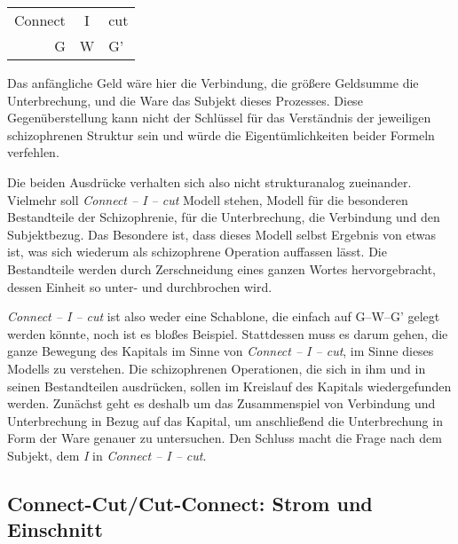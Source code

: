 \documentclass[12pt,
               paper=a4,
               twoside=false,
               onehalfspacing,
               bibliography=totoc,
               toc=graduated,
               ]{scrartcl}
\newcommand{\worries}[1]{\ifdraft{\textcolor{blue}{\texttt{(#1)}}}{}}
\newcommand{\gwg}{G--W--G'\xspace}
\newcommand{\cic}{Connect -- I -- cut\xspace}
\begin{document}
{\centering\hfill
\begin{tabular}{r@{ -- }c@{ -- }l}
Connect & I & cut\\
G & W & G'
\end{tabular}
\hfill}

Das anfängliche Geld wäre hier die Verbindung, die größere Geldsumme
die Unterbrechung, und die Ware das Subjekt dieses Prozesses. Diese
Gegenüberstellung kann nicht der Schlüssel für das Verständnis der
jeweiligen schizophrenen Struktur sein und würde die
Eigentümlichkeiten beider Formeln verfehlen.

Die beiden Ausdrücke verhalten sich also nicht strukturanalog
zueinander. Vielmehr soll \emph{\cic} Modell stehen, Modell für die
besonderen Bestandteile der Schizophrenie, für die Unterbrechung, die
Verbindung und den Subjektbezug. Das Besondere ist, dass dieses Modell
selbst Ergebnis von etwas ist, was sich wiederum als schizophrene
Operation auffassen lässt. Die Bestandteile werden durch Zerschneidung
eines ganzen Wortes hervorgebracht, dessen Einheit so unter- und
durchbrochen wird.

\emph{\cic} ist also weder eine Schablone, die einfach auf \gwg gelegt
werden könnte, noch ist es bloßes Beispiel. Stattdessen muss es darum
gehen, die ganze Bewegung des Kapitals im Sinne von \emph{\cic}, im
Sinne dieses Modells zu verstehen. Die schizophrenen Operationen, die
sich in ihm und in seinen Bestandteilen ausdrücken, sollen im
Kreislauf des Kapitals wiedergefunden werden. Zunächst geht es deshalb
um das Zusammenspiel von Verbindung und Unterbrechung in Bezug auf das
Kapital, um anschließend die Unterbrechung in Form der Ware genauer zu
untersuchen. Den Schluss macht die Frage nach dem Subjekt, dem
\emph{I} in \emph{\cic}.



\subsection{Connect-Cut/Cut-Connect: Strom und Einschnitt}

\end{document}
